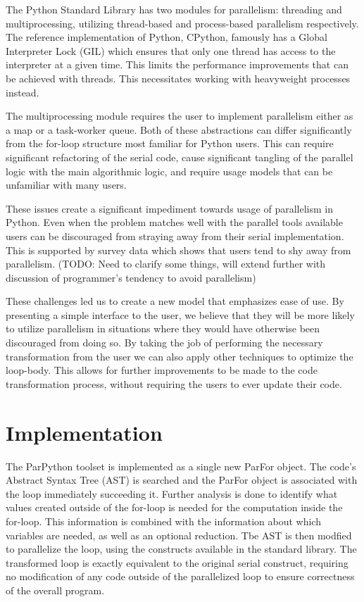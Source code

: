 \documentclass[conference]{IEEEtran}
\begin{document}
The Python Standard Library has two modules for parallelism:
threading and multiprocessing, utilizing thread-based and 
process-based parallelism respectively.
The reference implementation of Python, CPython, famously has a 
Global Interpreter Lock (GIL) which ensures that only one thread 
has access to the interpreter at a given
time.\cite{beazley2010understanding}
This limits the performance improvements that can be achieved with
threads.
This necessitates working with heavyweight processes instead.

The multiprocessing module requires the user to implement parallelism 
either as a map or a task-worker queue. 
Both of these abstractions can differ significantly from the for-loop 
structure most familiar for Python users. 
This can require significant refactoring of the serial code, cause 
significant tangling of the parallel logic with the main algorithmic 
logic, and require usage models that can be unfamiliar with many users.

These issues create a significant impediment towards usage of parallelism in Python. 
Even when the problem matches well with the parallel tools available 
users can be discouraged from straying away from their serial 
implementation.
This is supported by survey data which shows that users tend to shy away from parallelism.
(TODO: Need to clarify some things, will extend further with discussion of programmer's tendency to avoid parallelism)


These challenges led us to create a new model that emphasizes ease of use.
By presenting a simple interface to the user, we believe that they will
be more likely to utilize parallelism in situations where they would have
otherwise been discouraged from doing so. 
By taking the job of performing the necessary transformation from
the user we can also apply other techniques to optimize the loop-body.
This allows for further improvements to be made to the code transformation
process, without requiring the users to ever update their code. 


\section{Implementation}

The ParPython toolset is implemented as a single new ParFor object. 
The code's Abstract Syntax Tree (AST) is searched and the ParFor object
is associated with the loop immediately succeeding it.
Further analysis is done to identify what values created outside 
of the for-loop is needed for the computation inside the for-loop.
This information is combined with the information about which variables
are needed, as well as an optional reduction.
Tbe AST is then modfied to parallelize the loop, using the constructs available in the standard library. 
The transformed loop is exactly equivalent to the original serial construct, requiring no modification of any code outside of the 
parallelized loop to ensure correctness of the overall program.
\end{document}
